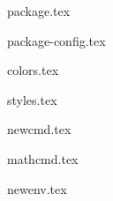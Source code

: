
\makeatletter

{package.tex}

{package-config.tex}

{colors.tex}

{styles.tex}

{newcmd.tex}

{mathcmd.tex}

{newenv.tex}

\makeatother

